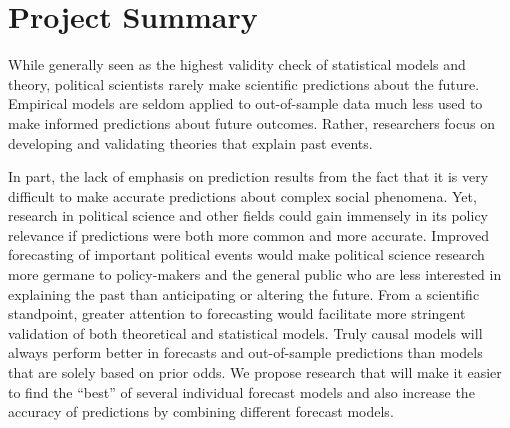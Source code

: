 \documentclass[pdftex,12pt,fullpage,oneside]{amsart}
\begin{document}




\newpage

\section*{Project Summary}

While generally seen as the highest validity check of statistical
models and theory, political scientists rarely make scientific
predictions about the future.  Empirical models are seldom applied to %
out-of-sample data much less used to make informed predictions about
future outcomes.  Rather, researchers focus on developing and
validating theories that explain past events.

In part, the lack of emphasis on prediction results from the fact that
it is very difficult to make accurate predictions about complex social
phenomena. Yet, research in political science and other fields could
gain immensely in its policy relevance if predictions were both more
common and more accurate.  Improved forecasting of important political
events would make political science research more germane to
policy-makers and the general public who are less interested in
explaining the past than anticipating or altering the future.  From a
scientific standpoint, greater attention to forecasting would
facilitate more stringent validation of both theoretical and
statistical models. Truly causal models will always perform better in
forecasts and out-of-sample predictions than models that are solely
based on prior odds. We propose research that will make it easier to
find the ``best'' of several individual forecast models and also
increase the accuracy of predictions by combining different forecast
models.
\end{document}
